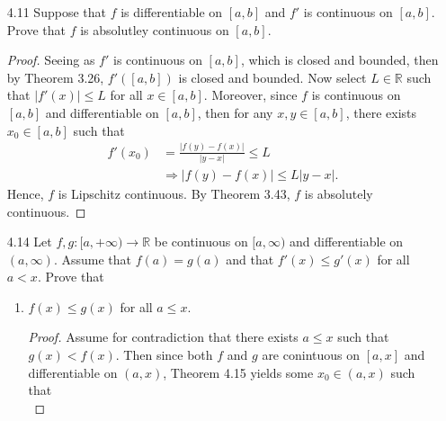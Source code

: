 \documentclass[12pt]{article}
\theoremstyle{definition}
\newcommand{\abs}[1]{\lvert #1 \rvert}
\begin{document}
\begin{enumerate}
            \item[4.11] Suppose that $f$ is differentiable on $[a, b]$ and $f'$
                is continuous on $[a, b]$. Prove that $f$ is absolutley
                continuous on $[a, b]$.
                    \begin{proof}
                        Seeing as $f'$ is continuous on $[a, b]$, which is
                        closed and bounded, then by Theorem 3.26, $f'([a, b])$
                        is closed and bounded. Now select $L\in\mathbb{R}$ such
                        that $\abs{f'(x)}\leq L$ for all $x\in[a, b]$.
                        Moreover, since $f$ is continuous on $[a, b]$ and
                        differentiable on $[a, b]$, then for any $x, y\in [a,
                        b]$, there exists $x_0\in[a, b]$ such that 
                            \begin{equation*}
                                \begin{split}
                                    f'(x_0)&=\frac{\abs{f(y)-f(x)}}{\abs{y-x}}\leq
                                    L \\
                                    &\Rightarrow \abs{f(y)-f(x)}\leq L\abs{y-x}.
                                \end{split}
                            \end{equation*}
                        Hence, $f$ is Lipschitz continuous. By Theorem 3.43,
                        $f$ is absolutely continuous.
                    \end{proof}\newpage
            \item[4.14] Let $f, g:[a, +\infty)\to\mathbb{R}$ be continuous on
                $[a, \infty)$ and differentiable on $(a, \infty)$. Assume that
                $f(a)=g(a)$ and that $f'(x)\leq g'(x)$ for all $a<x$. Prove
                that
                    \begin{enumerate}[label=(\arabic*)]
                        \item $f(x)\leq g(x)$ for all $a\leq x$.
                            \begin{proof}
                                Assume for contradiction that there exists
                                $a\leq x$ such that $g(x)<f(x)$. Then since
                                both $f$ and $g$ are conintuous on $[a, x]$ and
                                differentiable on $(a, x)$, Theorem 4.15 yields
                                some $x_0\in(a, x)$ such that 
                                    \begin{equation*}

\end{equation*}
\end{proof}
\end{enumerate}
\end{enumerate}
\end{document}
